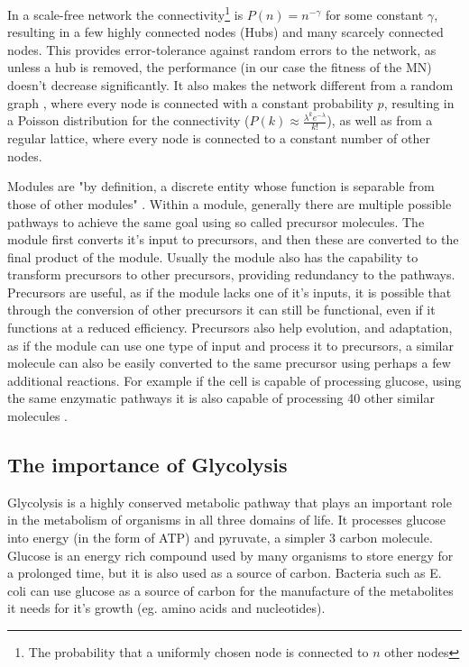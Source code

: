 \documentclass[a4paper,12pt]{article}
\begin{document}
	In a scale-free network the connectivity\footnote{The probability that a uniformly chosen node is connected to $n$ other nodes} is $P(n)=n^{-\gamma}$ for some constant $\gamma$, resulting in a few highly connected nodes (Hubs) and many scarcely connected nodes. This provides error-tolerance against random errors to the network, as unless a hub is removed, the performance (in our case the fitness of the MN) doesn't decrease significantly. It also makes the network different from a random graph \cite{randomgraphs}, where every node is connected with a constant probability $p$, resulting in a Poisson distribution for the connectivity ($P(k) \approx \frac{\lambda^k e^{-\lambda}}{k!} $), as well as from a regular lattice, where every node is connected to a constant number of other nodes.
	  
	Modules are "by definition, a discrete entity whose function is separable from those of other modules" \cite{modulardef}. Within a module, generally there are multiple possible pathways to achieve the same goal using so called precursor molecules. The module first converts it's input to precursors, and then these are converted to the final product of the module. Usually the module also has the capability to transform precursors to other precursors, providing redundancy to the pathways. Precursors are useful, as if the module lacks one of it's inputs, it is possible that through the conversion of other precursors it can still be functional, even if it functions at a reduced efficiency. Precursors also help evolution, and adaptation, as if the module can use one type of input and process it to precursors, a similar molecule can also be easily converted to the same precursor using perhaps a few additional reactions. For example if the cell is capable of processing glucose, using the same enzymatic pathways it is also capable of processing 40 other similar molecules \cite{latent}.
	
\subsection{The importance of Glycolysis}
\label{sub:importance_of_glycolysis}

Glycolysis is a highly conserved metabolic pathway that plays an important role in the metabolism of organisms in all three domains of life. It processes glucose into energy (in the form of ATP) and pyruvate, a simpler 3 carbon molecule. Glucose is an energy rich compound used by many organisms to store energy for a prolonged time, but it is also used as a source of carbon. Bacteria such as E. coli can use glucose as a source of carbon for the manufacture of the metabolites it needs for it's growth (eg. amino acids and nucleotides). \cite[]{principlesofbio} 
\end{document}
